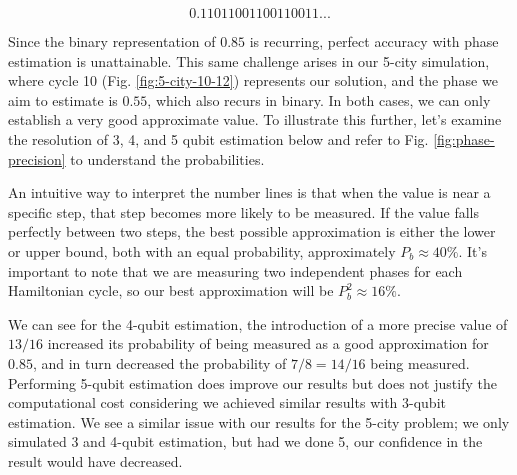 \documentclass[msc,oneside]{ubcthesis}
\begin{document}
	$$0.11011001100110011...$$
	
Since the binary representation of $0.85$ is recurring, perfect accuracy with phase estimation is unattainable. This same challenge arises in our 5-city simulation, where cycle 10 (Fig. \ref{fig:5-city-10-12}) represents our solution, and the phase we aim to estimate is $0.55$, which also recurs in binary. In both cases, we can only establish a very good approximate value. To illustrate this further, let's examine the resolution of 3, 4, and 5 qubit estimation below and refer to Fig. \ref{fig:phase-precision} to understand the probabilities.
	
	
An intuitive way to interpret the number lines is that when the value is near a specific step, that step becomes more likely to be measured. If the value falls perfectly between two steps, the best possible approximation is either the lower or upper bound, both with an equal probability, approximately $P_b \approx 40\%$. It's important to note that we are measuring two independent phases for each Hamiltonian cycle, so our best approximation will be $P_b^2 \approx 16\%$.
	
We can see for the 4-qubit estimation, the introduction of a more precise value of $13/16$ increased its probability of being measured as a good approximation for $0.85$, and in turn decreased the probability of $7/8 = 14/16$ being measured. Performing 5-qubit estimation does improve our results but does not justify the computational cost considering we achieved similar results with 3-qubit estimation. We see a similar issue with our results for the 5-city problem; we only simulated 3 and 4-qubit estimation, but had we done 5, our confidence in the result would have decreased.
	
\end{document}

